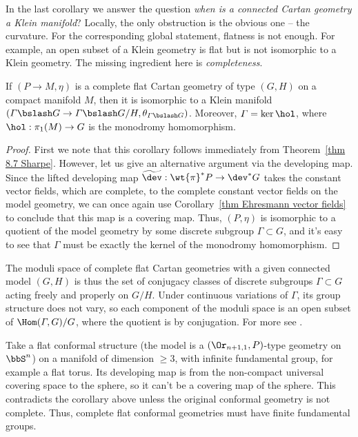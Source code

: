 In the last corollary we answer the question \emph{when is a connected Cartan geometry a Klein manifold}? Locally, the only obstruction is the obvious one -- the curvature. For the corresponding global statement, flatness is not enough. For example, an open subset of a Klein geometry is flat but is not isomorphic to a Klein geometry. The missing ingredient here is \emph{completeness}.

\begin{cor}\label{cor uniformization of complete flat cartan}
    If $(P\to M,\eta)$ is a complete flat Cartan geometry of type $(G,H)$ on a compact manifold $M$, then it is isomorphic to a Klein manifold $(\varGamma\bslash G\to \varGamma\bslash G\slash H,\theta_{\varGamma\bslash G})$. Moreover, $\varGamma=\ker\hol$, where $\hol:\pi_1(M)\to G$ is the monodromy homomorphism.
\end{cor}
\begin{proof}
    First we note that this corollary follows immediately from Theorem~\ref{thm 8.7 Sharpe}. However, let us give an alternative argument via the developing map. Since the lifted developing map $\widetilde{\dev}:\wt{\pi}^\ast P\to \dev^\ast G$ takes the constant vector fields, which are complete, to the complete constant vector fields on the model geometry, we can once again use Corollary~\ref{thm Ehresmann vector fields} to conclude that this map is a covering map. Thus, $(P,\eta)$ is isomorphic to a quotient of the model geometry by some discrete subgroup $\varGamma\subset G$, and it's easy to see that $\varGamma$ must be exactly the kernel of the monodromy homomorphism.
\end{proof}

\begin{rem}
    The moduli space of complete flat Cartan geometries with a given connected model $(G,H)$ is thus the set of conjugacy classes of discrete subgroups $\varGamma\subset G$ acting freely and properly on $G\slash H$. Under continuous variations of $\varGamma$, its group structure does not vary, so each component of the moduli space is an open subset of $\Hom(\varGamma,G)\slash G$, where the quotient is by conjugation. For more see \cite[p.~165]{Goldman}.
\end{rem}

\begin{example}\label{ex flat conformal structures}
    Take a flat conformal structure (the model is a $(\Or_{n+1,1},P)$-type geometry on $\bbS^n$) on a manifold of dimension $\geq 3$, with infinite fundamental group, for example a flat torus. Its developing map is from the non-compact universal covering space to the sphere, so it can't be a covering map of the sphere. This contradicts the corollary above unless the original conformal geometry is not complete. Thus, complete flat conformal geometries must have finite fundamental groups.
\end{example}

